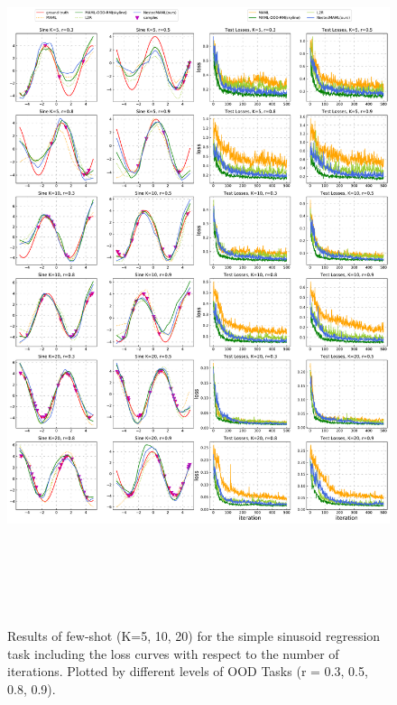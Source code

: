 \begin{figure}[!htbp]
    \centering
    \includegraphics[width=0.96\columnwidth, height=21cm]{figs/regression.pdf}
    \caption{Results of few-shot (K=5, 10, 20) for the simple sinusoid regression task including the loss curves with respect to the number of iterations. Plotted by different levels of OOD Tasks (r = 0.3, 0.5, 0.8, 0.9).}
    \label{synthetic_regression}
\end{figure}

